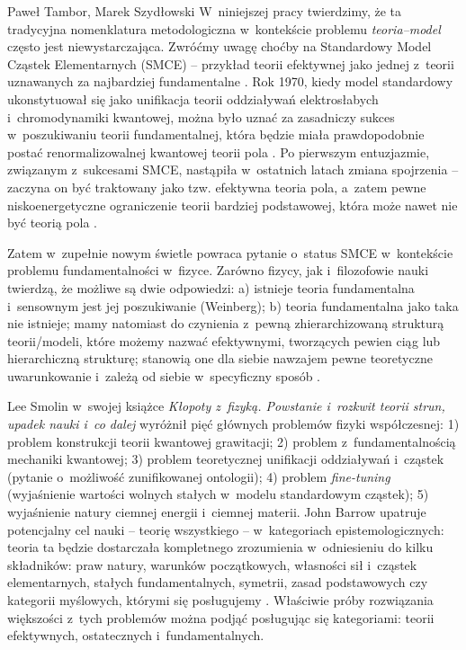 \begin{artplenv2auth}{Paweł Tambor, Marek Szydłowski}
W~niniejszej pracy twierdzimy, że ta tradycyjna nomenklatura metodologiczna w~kontekście problemu \textit{teoria–model} często jest niewystarczająca. Zwróćmy uwagę choćby na Standardowy Model Cząstek Elementarnych (SMCE) -- przykład teorii efektywnej jako jednej z~teorii uznawanych za najbardziej fundamentalne
\parencite[][]{kaplan_effective_1999}. %
 Rok 1970, kiedy model standardowy ukonstytuował się jako unifikacja teorii oddziaływań elektrosłabych i~chromodynamiki kwantowej, można było uznać za zasadniczy sukces w~poszukiwaniu teorii fundamentalnej, która będzie miała prawdopodobnie postać renormalizowalnej kwantowej teorii pola 
\parencite[][]{weinberg_newtonianism_1987}. %
 Po pierwszym entuzjazmie, związanym z~sukcesami SMCE, nastąpiła w~ostatnich latach zmiana spojrzenia -- zaczyna on być traktowany jako tzw. efektywna teoria pola, a~zatem pewne niskoenergetyczne ograniczenie teorii bardziej podstawowej, która może nawet nie być teorią pola 
\parencites[][]{hartmann_effective_2001}[por.][]{weinberg_what_1997}.%


Zatem w~zupełnie nowym świetle powraca pytanie o~status SMCE w~kontekście problemu fundamentalności w~fizyce. Zarówno fizycy, jak i~filozofowie nauki twierdzą, że możliwe są dwie odpowiedzi: a) istnieje teoria fundamentalna i~sensownym jest jej poszukiwanie (Weinberg); b) teoria fundamentalna jako taka nie istnieje; mamy natomiast do czynienia z~pewną zhierarchizowaną strukturą teorii/modeli, które możemy nazwać efektywnymi, tworzących pewien ciąg lub hierarchiczną strukturę; stanowią one dla siebie nawzajem pewne teoretyczne uwarunkowanie i~zależą od siebie w~specyficzny sposób
\parencite[][]{cao_conceptual_1993}.%


Lee Smolin w~swojej książce \textit{Kłopoty z~fizyką. Powstanie i~rozkwit teorii strun, upadek nauki i~co dalej}
\parencite*[][]{smolin_klopoty_2008}
wyróżnił pięć głównych problemów fizyki współczesnej: 1) problem konstrukcji teorii kwantowej grawitacji; 2) problem z~fundamentalnością mechaniki kwantowej; 3) problem teoretycznej unifikacji oddziaływań i~cząstek (pytanie o~możliwość zunifikowanej ontologii); 4) problem \textit{fine-tuning} (wyjaśnienie wartości wolnych stałych w~modelu standardowym cząstek); 5) wyjaśnienie natury ciemnej energii i~ciemnej materii.
 John Barrow upatruje potencjalny cel nauki -- teorię wszystkiego -- w~kategoriach epistemologicznych: teoria ta będzie dostarczała kompletnego zrozumienia w~odniesieniu do kilku składników: praw natury, warunków początkowych, własności sił i~cząstek elementarnych, stałych fundamentalnych, symetrii, zasad podstawowych czy kategorii myślowych, którymi się posługujemy 
\parencite[][s.~4]{barrow_new_2007}. %
 Właściwie próby rozwiązania większości z~tych problemów można podjąć posługując się kategoriami: teorii efektywnych, ostatecznych i~fundamentalnych.


\end{artplenv2auth}
